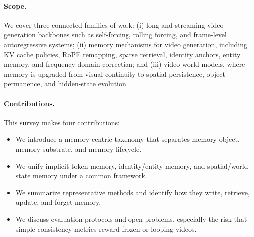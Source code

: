 \paragraph{Scope.} We cover three connected families of work: (i) long and streaming video generation backbones such as self-forcing, rolling forcing, and frame-level autoregressive systems; (ii) memory mechanisms for video generation, including KV cache policies, RoPE remapping, sparse retrieval, identity anchors, entity memory, and frequency-domain correction; and (iii) video world models, where memory is upgraded from visual continuity to spatial persistence, object permanence, and hidden-state evolution.

\paragraph{Contributions.} This survey makes four contributions:
\begin{itemize}[leftmargin=1.2em]
    \item We introduce a memory-centric taxonomy that separates memory object, memory substrate, and memory lifecycle.
    \item We unify implicit token memory, identity/entity memory, and spatial/world-state memory under a common framework.
    \item We summarize representative methods and identify how they write, retrieve, update, and forget memory.
    \item We discuss evaluation protocols and open problems, especially the risk that simple consistency metrics reward frozen or looping videos.
\end{itemize}
